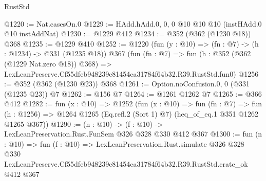 \begin{lexlean}{RustStd}
\begin{coremodule}
@1220 := Nat.casesOn.{0}
@1229 := HAdd.hAdd.{0, 0, 0} @10 @10 @10 (instHAdd.{0} @10 instAddNat)
@1230 := @1229 @412
@1234 := @352 (@362 (@1230 @18)) @368
@1235 := @1229 @410
@1252 := @1220
    (fun (y : @10) => (fn : @7) -> (h : @1234) -> @331 (@1235 @18))
    @367
    (fun (fn : @7) =>
    fun (h : @352 (@362 (@1229 Nat.zero @18)) @368) =>
    LexLeanPreserve.Cf55dfeb948239c81454ca31784f64b32.R39.RustStd.fun0)
@1256 := @352 (@362 (@1230 @23)) @368
@1261 := Option.noConfusion.{0, 0} (@331 (@1235 @23)) @7
@1262 := @156 @7
@1264 := @1261 @1262 @7
@1265 := @366 @412
@1282 := fun (x : @10) =>
  @1252
    (fun (x : @10) =>
    fun (fn : @7) =>
    fun (h : @1256) => @1264 @1265 (Eq.refl.{2} (Sort 1) @7) (heq_of_eq.{1} @351 @1262 @1265 @367))
@1290 := (n : @10) -> (f : @10) -> LexLeanPreservation.Rust.FunSem @326 @328 @330 @412 @367
@1300 := fun (n : @10) =>
  fun (f : @10) =>
  LexLeanPreservation.Rust.simulate
    @326
    @328
    @330
    LexLeanPreserve.Cf55dfeb948239c81454ca31784f64b32.R39.RustStd.crate_ok
    @412
    @367
\end{coremodule}
\end{lexlean}
